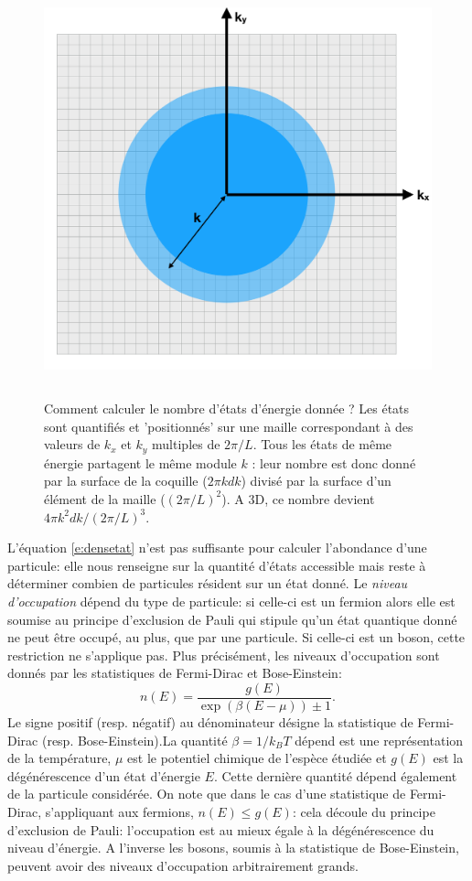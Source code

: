 \begin{figure}[htbp]
	\centering
		\includegraphics[height=12cm]{figs/k.png}
	\caption{Comment calculer le nombre d'états d'énergie donnée ? Les états sont quantifiés et 'positionnés' sur une maille correspondant à des valeurs de $k_x$ et $k_y$ multiples de $2\pi/L$. Tous les états de même énergie partagent le même module $k$ : leur nombre est donc donné par la surface de la coquille ($2\pi k dk$) divisé par la surface d'un élément de la maille ($(2\pi/L)^2$). A 3D, ce nombre devient $4 \pi k^2 dk / (2\pi/L)^3$.}
	\label{f:k}
\end{figure}

L'équation \ref{e:densetat} n'est pas suffisante pour calculer l'abondance d'une particule: elle nous renseigne sur la quantité d'états accessible mais reste à déterminer combien de particules résident sur un état donné. Le \textit{niveau d'occupation} dépend du type de particule: si celle-ci est un fermion alors elle est soumise au principe d'exclusion de Pauli qui stipule qu'un état quantique donné ne peut être occupé, au plus, que par une particule. Si celle-ci est un boson, cette restriction ne s'applique pas. Plus précisément, les niveaux d'occupation sont donnés par les statistiques de Fermi-Dirac et Bose-Einstein:
\begin{equation}
n(E)=\frac{g(E)}{\exp(\beta(E-\mu))\pm 1}.
\label{e:BEFD}
\end{equation}
Le signe positif (resp. négatif) au dénominateur désigne la statistique de Fermi-Dirac (resp. Bose-Einstein).La quantité $\beta=1/k_B T$ dépend est une représentation de la température, $\mu$ est le potentiel chimique de l'espèce étudiée et $g(E)$ est la dégénérescence d'un état d'énergie $E$. Cette dernière quantité dépend également de la particule considérée. On note que dans le cas d'une statistique de Fermi-Dirac, s'appliquant aux fermions, $n(E)\le g(E)$: cela découle du principe d'exclusion de Pauli: l'occupation est au mieux égale à la dégénérescence du niveau d'énergie. A l'inverse les bosons, soumis à la statistique de Bose-Einstein, peuvent avoir des niveaux d'occupation arbitrairement grands.

